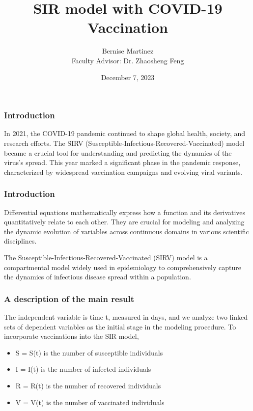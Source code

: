 \documentclass{beamer}
\title[SIRV Model]{SIR model with COVID-19 Vaccination}
\author[ B. Martinez, Z. Feng ]{ Bernise Martinez \texorpdfstring{ \\
Faculty Advisor: Dr. Zhaosheng Feng}{}}
\institute[UTRGV]
{University of Texas Rio Grande Valley \\
\textit{bernise.martinez01@utrgv.edu}}
\date{December 7, 2023}
\let\olditem\item
\renewcommand{\item}{\setlength{\itemsep}{\fill}\olditem}
\begin{document}

\begin{frame}  %
\titlepage   
\end{frame}   %


\begin{frame} 
\frametitle{Introduction}
In 2021, the COVID-19 pandemic continued to shape global health, society, and research efforts. The SIRV (Susceptible-Infectious-Recovered-Vaccinated) model became a crucial tool for understanding and predicting the dynamics of the virus's spread. This year marked a significant phase in the pandemic response, characterized by widespread vaccination campaigns and evolving viral variants.

\end{frame}

\begin{frame} 
\frametitle{Introduction}
Differential equations mathematically express how a function and its derivatives quantitatively relate to each other. They are crucial for modeling and analyzing the dynamic evolution of variables across continuous domains in various scientific disciplines.

\medskip

The Susceptible-Infectious-Recovered-Vaccinated (SIRV) model is a compartmental model widely used in epidemiology to comprehensively capture the dynamics of infectious disease spread within a population.


\end{frame} 


\begin{frame} 
\frametitle{A description of the main result}
The independent variable is time t, measured in days, and we analyze two linked sets of dependent variables as the initial stage in the modeling procedure.
To incorporate vaccinations into the SIR model, 

\begin{itemize}
    \item S = S(t) is the number of susceptible individuals 
    \item I = I(t) is the number of infected individuals
    \item R = R(t) is the number of recovered individuals
    \item V = V(t) is the number of vaccinated individuals
\end{itemize}
\end{frame}   
 
\end{document}
